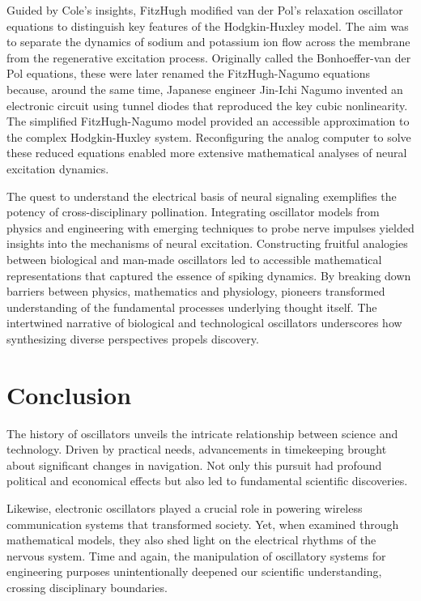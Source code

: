 Guided by Cole's insights, FitzHugh modified van der Pol's relaxation oscillator equations to distinguish key features of the Hodgkin-Huxley model. The aim was to separate the dynamics of sodium and potassium ion flow across the membrane from the regenerative excitation process. Originally called the Bonhoeffer-van der Pol equations, these were later renamed the FitzHugh-Nagumo equations because, around the same time, Japanese engineer Jin-Ichi Nagumo invented an electronic circuit using tunnel diodes that reproduced the key cubic nonlinearity. The simplified FitzHugh-Nagumo model provided an accessible approximation to the complex Hodgkin-Huxley system. Reconfiguring the analog computer to solve these reduced equations enabled more extensive mathematical analyses of neural excitation dynamics.

The quest to understand the electrical basis of neural signaling exemplifies the potency of cross-disciplinary pollination. Integrating oscillator models from physics and engineering with emerging techniques to probe nerve impulses yielded insights into the mechanisms of neural excitation. Constructing fruitful analogies between biological and man-made oscillators led to accessible mathematical representations that captured the essence of spiking dynamics. By breaking down barriers between physics, mathematics and physiology, pioneers transformed understanding of the fundamental processes underlying thought itself. The intertwined narrative of biological and technological oscillators underscores how synthesizing diverse perspectives propels discovery.

\section{Conclusion}

The history of oscillators unveils the intricate relationship between science and technology. Driven by practical needs, advancements in timekeeping brought about significant changes in navigation. Not only this pursuit had profound political and economical effects but also led to fundamental scientific discoveries.

Likewise, electronic oscillators played a crucial role in powering wireless communication systems that transformed society. Yet, when examined through mathematical models, they also shed light on the electrical rhythms of the nervous system. Time and again, the manipulation of oscillatory systems for engineering purposes unintentionally deepened our scientific understanding, crossing disciplinary boundaries.

